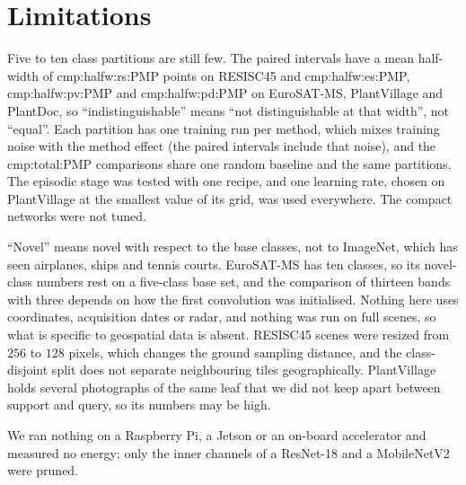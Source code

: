 \section{Limitations}
\label{sec:limits}

Five to ten class partitions are still few. The paired intervals have a mean half-width of \num{cmp:halfw:rs:PMP} points on RESISC45 and \num{cmp:halfw:es:PMP}, \num{cmp:halfw:pv:PMP} and \num{cmp:halfw:pd:PMP} on EuroSAT-MS, PlantVillage and PlantDoc, so ``indistinguishable'' means ``not distinguishable at that width'', not ``equal''. Each partition has one training run per method, which mixes training noise with the method effect (the paired intervals include that noise), and the \num{cmp:total:PMP} comparisons share one random baseline and the same partitions.  The episodic stage was tested with one recipe, and one learning rate, chosen on PlantVillage at the smallest value of its grid, was used everywhere. The compact networks were not tuned.

``Novel'' means novel with respect to the base classes, not to ImageNet, which has seen airplanes, ships and tennis courts. EuroSAT-MS has ten classes, so its novel-class numbers rest on a five-class base set, and the comparison of thirteen bands with three depends on how the first convolution was initialised. Nothing here uses coordinates, acquisition dates or radar, and nothing was run on full scenes, so what is specific to geospatial data is absent. RESISC45 scenes were resized from $256$ to $128$ pixels, which changes the ground sampling distance, and the class-disjoint split does not separate neighbouring tiles geographically. PlantVillage holds several photographs of the same leaf that we did not keep apart between support and query, so its numbers may be high.

We ran nothing on a Raspberry Pi, a Jetson or an on-board accelerator and measured no energy; only the inner channels of a ResNet-18 and a MobileNetV2 were pruned.
